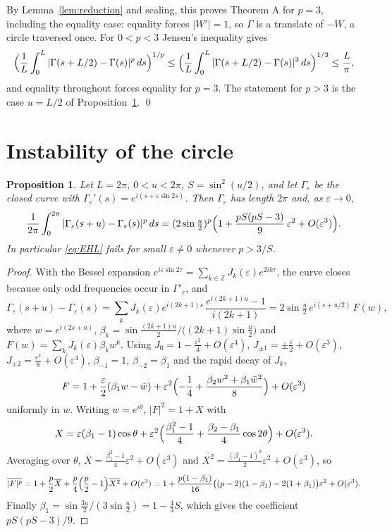 \documentclass[11pt]{amsart}
\newtheorem{proposition}[theorem]{Proposition}
\theoremstyle{definition}
\theoremstyle{remark}
\begin{document}
By Lemma~\ref{lem:reduction} and scaling, this proves Theorem A for $p=3$, including the equality case: equality forces $|W'|=1$, so $\Gamma$ is a translate of $-W$, a circle traversed once. For $0<p<3$ Jensen's inequality gives
\[
\Bigl(\frac1L\int_0^L|\Gamma(s+L/2)-\Gamma(s)|^p\,ds\Bigr)^{1/p}\le\Bigl(\frac1L\int_0^L|\Gamma(s+L/2)-\Gamma(s)|^3\,ds\Bigr)^{1/3}\le\frac L\pi ,
\]
and equality throughout forces equality for $p=3$. The statement for $p>3$ is the case $u=L/2$ of Proposition~\ref{prop:mode2}. \qed

\section{Instability of the circle}\label{sec:sharp}

\begin{proposition}\label{prop:mode2}
Let $L=2\pi$, $0<u<2\pi$, $S=\sin^2(u/2)$, and let $\Gamma_\varepsilon$ be the closed curve with $\Gamma_\varepsilon'(s)=e^{i(s+\varepsilon\sin2s)}$. Then $\Gamma_\varepsilon$ has length $2\pi$ and, as $\varepsilon\to0$,
\[
\frac1{2\pi}\int_0^{2\pi}|\Gamma_\varepsilon(s+u)-\Gamma_\varepsilon(s)|^p\,ds=(2\sin\tfrac u2)^p\Bigl(1+\frac{pS(pS-3)}9\,\varepsilon^2+O(\varepsilon^3)\Bigr).
\]
In particular \eqref{eq:EHL} fails for small $\varepsilon\neq0$ whenever $p>3/S$.
\end{proposition}

\begin{proof}
With the Bessel expansion $e^{i\varepsilon\sin2\tau}=\sum_{k\in\mathbb Z}J_k(\varepsilon)e^{2ik\tau}$, the curve closes because only odd frequencies occur in $\Gamma'_\varepsilon$, and
\[
\Gamma_\varepsilon(s+u)-\Gamma_\varepsilon(s)=\sum_kJ_k(\varepsilon)e^{i(2k+1)s}\,\frac{e^{i(2k+1)u}-1}{i(2k+1)}=2\sin\tfrac u2\,e^{i(s+u/2)}\,F(w),
\]
where $w=e^{i(2s+u)}$, $\beta_k=\sin\frac{(2k+1)u}2\big/\bigl((2k+1)\sin\frac u2\bigr)$ and $F(w)=\sum_kJ_k(\varepsilon)\beta_kw^k$. Using $J_0=1-\frac{\varepsilon^2}4+O(\varepsilon^4)$, $J_{\pm1}=\pm\frac\varepsilon2+O(\varepsilon^3)$, $J_{\pm2}=\frac{\varepsilon^2}8+O(\varepsilon^4)$, $\beta_{-1}=1$, $\beta_{-2}=\beta_1$ and the rapid decay of $J_k$,
\[
F=1+\frac\varepsilon2(\beta_1w-\bar w)+\varepsilon^2\Bigl(-\frac14+\frac{\beta_2w^2+\beta_1\bar w^2}8\Bigr)+O(\varepsilon^3)
\]
uniformly in $w$. Writing $w=e^{i\theta}$, $|F|^2=1+X$ with
\[
X=\varepsilon(\beta_1-1)\cos\theta+\varepsilon^2\Bigl(\frac{\beta_1^2-1}4+\frac{\beta_2-\beta_1}4\cos2\theta\Bigr)+O(\varepsilon^3).
\]
Averaging over $\theta$, $\overline X=\frac{\beta_1^2-1}4\varepsilon^2+O(\varepsilon^3)$ and $\overline{X^2}=\frac{(\beta_1-1)^2}2\varepsilon^2+O(\varepsilon^3)$, so
\[
\overline{|F|^p}=1+\frac p2\overline X+\frac p4\Bigl(\frac p2-1\Bigr)\overline{X^2}+O(\varepsilon^3)
=1+\frac{p(1-\beta_1)}{16}\bigl((p-2)(1-\beta_1)-2(1+\beta_1)\bigr)\varepsilon^2+O(\varepsilon^3).
\]
Finally $\beta_1=\sin\frac{3u}2/(3\sin\frac u2)=1-\frac43S$, which gives the coefficient $pS(pS-3)/9$.
\end{proof}
\end{document}
